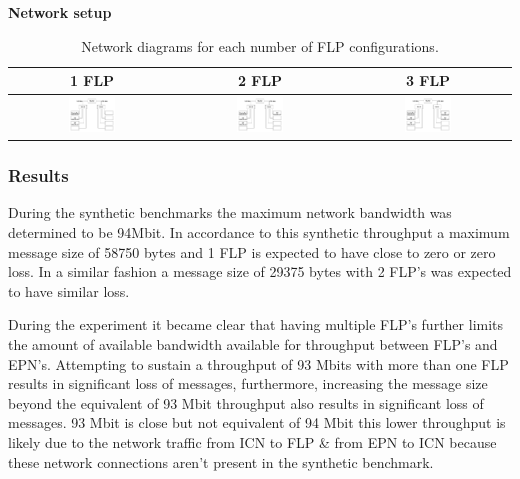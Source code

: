 \documentclass[]{article}
\begin{document}
\begin{table}[H]
	\textbf{Network setup}
	\begin{center}
		\begin{tabular}{ | c | c | c | }
			\hline
			\textbf{1 FLP} & \textbf{2 FLP} & \textbf{3 FLP} \\ \hline
			
			\includegraphics[width=0.3\textwidth]{network-baseline-1} & \includegraphics[width=0.3\textwidth]{network-baseline-2} & \includegraphics[width=0.3\textwidth]{network-baseline-3} \\ \hline
		\end{tabular}
		\caption{Network diagrams for each number of FLP configurations.}
		\label{tab:specs}
	\end{center}
\end{table}


\subsubsection{Results}
During the synthetic benchmarks the maximum network bandwidth was determined to be 94Mbit. In accordance to this synthetic throughput a maximum message size of 58750 bytes and 1 FLP is expected to have close to zero or zero loss. In a similar fashion a message size of 29375 bytes with 2 FLP’s was expected to have similar loss. 

During the experiment it became clear that having multiple FLP’s further limits the amount of available bandwidth available for throughput between FLP’s and EPN’s. Attempting to sustain a throughput of 93 Mbits with more than one FLP results in significant loss of messages, furthermore, increasing the message size beyond the equivalent of 93 Mbit throughput also results in significant loss of messages. 93 Mbit is close but not equivalent of 94 Mbit this lower throughput is likely due to the network traffic from ICN to FLP \& from EPN to ICN because these network connections aren’t present in the synthetic benchmark.
\end{document}
